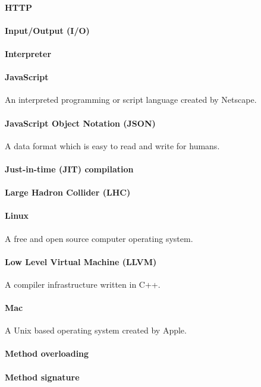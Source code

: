 \paragraph{HTTP}
\paragraph{Input/Output (I/O)}
\paragraph{Interpreter}
\paragraph{JavaScript}
An interpreted programming or script language created by Netscape.
\paragraph{JavaScript Object Notation (JSON)}
A data format which is easy to read and write for humans.
\paragraph{Just-in-time (JIT) compilation}
\paragraph{Large Hadron Collider (LHC)}
\paragraph{Linux}
A free and open source computer operating system.
\paragraph{Low Level Virtual Machine (LLVM)}
A compiler infrastructure written in C++.
\paragraph{Mac}
A Unix based operating system created by Apple.
\paragraph{Method overloading}

\paragraph{Method signature}

